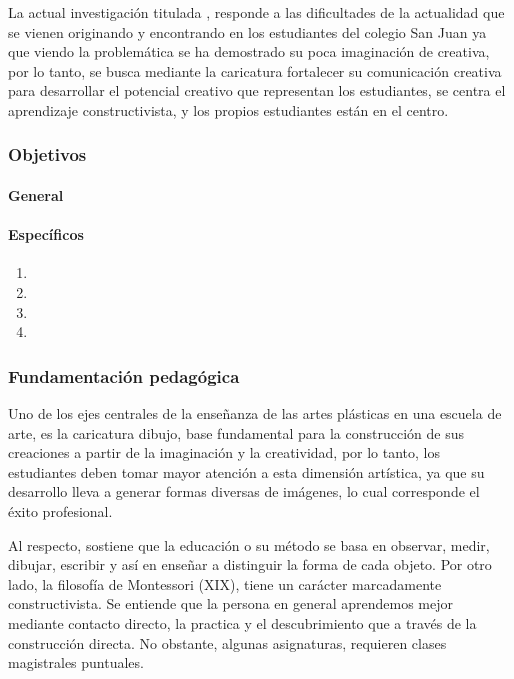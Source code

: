 \documentclass[12pt,a4paper]{article}
\begin{document}
La actual investigación titulada \titulo, responde a las dificultades de la actualidad que se vienen originando y encontrando en los estudiantes del colegio San Juan ya que viendo la problemática se ha demostrado su  poca imaginación de creativa, por lo tanto, se busca mediante la caricatura fortalecer su comunicación creativa para desarrollar el potencial creativo que representan los estudiantes, se centra el aprendizaje constructivista, y los propios estudiantes están en el centro.

\subsubsection{Objetivos}

\paragraph{General}

\objetivo

\paragraph{Específicos}

\begin{enumerate}
	\item \objetivoe
	\item \objetivoee
	\item \objetivoeee
	\item \objetivoeeee
\end{enumerate}

\subsubsection{Fundamentación pedagógica}

Uno de los ejes centrales de la enseñanza de las artes plásticas en una escuela de arte, es la caricatura dibujo, base fundamental para la construcción de sus creaciones a partir de la imaginación y la creatividad, por lo tanto, los estudiantes deben tomar mayor atención a esta dimensión artística, ya que su desarrollo lleva a generar formas diversas de imágenes, lo cual corresponde el éxito profesional.

Al respecto, \cite{pestalozzi} sostiene que la educación o su método se basa en observar, medir, dibujar, escribir y así en enseñar a distinguir la forma de cada objeto.
Por otro lado, la filosofía de Montessori (XIX), tiene un carácter marcadamente constructivista. Se entiende que la persona en general aprendemos mejor mediante contacto directo, la practica y el descubrimiento que a través de la construcción directa. No obstante, algunas asignaturas, requieren clases magistrales puntuales.
\end{document}
